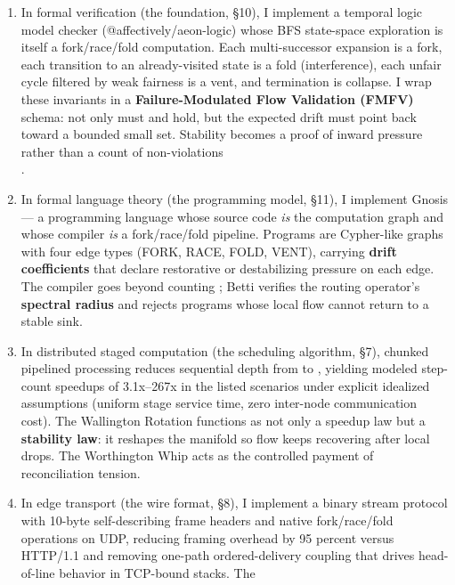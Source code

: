 \documentclass[
]{article}
\providecommand{\tightlist}{%
  \setlength{\itemsep}{0pt}\setlength{\parskip}{0pt}}
\begin{document}
\begin{enumerate}
\def\labelenumi{\arabic{enumi}.}
\tightlist
\item
  In formal verification (the foundation, §10), I implement a temporal
  logic model checker (@affectively/aeon-logic) whose BFS state-space
  exploration is itself a fork/race/fold computation. Each
  multi-successor expansion is a fork, each transition to an
  already-visited state is a fold (interference), each unfair cycle
  filtered by weak fairness is a vent, and termination is collapse. I
  wrap these invariants in a \textbf{Failure-Modulated Flow Validation
  (FMFV)} schema: not only must and hold, but the expected drift must
  point back toward a bounded small set. Stability becomes a proof of
  inward pressure rather than a count of non-violations\\
  .\\
\item
  In formal language theory (the programming model, §11), I implement
  Gnosis\\
  --- a programming language whose source code \emph{is} the computation
  graph and whose compiler \emph{is} a fork/race/fold pipeline. Programs
  are Cypher-like graphs with four edge types (FORK, RACE, FOLD, VENT),
  carrying \textbf{drift coefficients} that declare restorative or
  destabilizing pressure on each edge. The compiler goes beyond counting
  ; Betti verifies the routing operator's \textbf{spectral radius} and
  rejects programs whose local flow cannot return to a stable sink.\\
\item
  In distributed staged computation (the scheduling algorithm, §7),
  chunked pipelined processing reduces sequential depth from to ,
  yielding modeled step-count speedups of 3.1x--267x in the listed
  scenarios under explicit idealized assumptions (uniform stage service
  time, zero inter-node communication cost). The Wallington Rotation
  functions as not only a speedup law but a \textbf{stability law}: it
  reshapes the manifold so flow keeps recovering after local drops. The
  Worthington Whip acts as the controlled payment of reconciliation
  tension.\\
\item
  In edge transport (the wire format, §8), I implement a binary stream
  protocol with 10-byte self-describing frame headers and native
  fork/race/fold operations on UDP, reducing framing overhead by 95
  percent versus HTTP/1.1 and removing one-path ordered-delivery
  coupling that drives head-of-line behavior in TCP-bound stacks. The

\end{enumerate}
\end{document}

